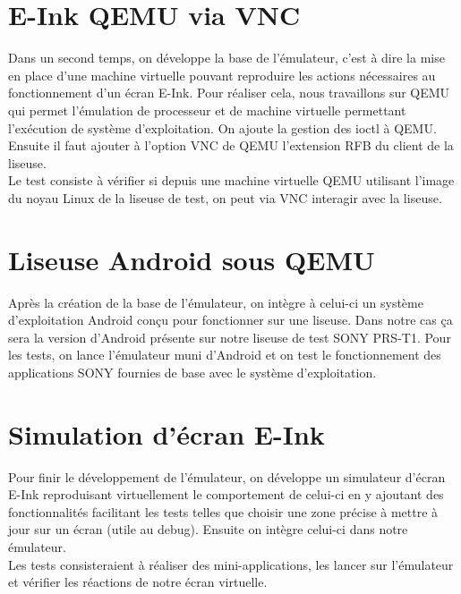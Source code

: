 \newpage

\section{E-Ink QEMU via VNC}

Dans un second temps, on développe la base de l'émulateur, c'est à dire la mise en place d'une machine virtuelle pouvant reproduire les actions nécessaires au fonctionnement d'un écran E-Ink. Pour réaliser cela, nous travaillons sur QEMU qui permet l'émulation de processeur et de machine virtuelle permettant l'exécution de système d'exploitation. On ajoute la gestion des ioctl à QEMU. Ensuite il faut ajouter à l'option VNC de QEMU l'extension RFB du client de la liseuse.
\\Le test consiste à vérifier si depuis une machine virtuelle QEMU utilisant l'image du noyau Linux de la liseuse de test, on peut via VNC interagir avec la liseuse. 


\section{Liseuse Android sous QEMU}

Après la création de la base de l'émulateur, on intègre à celui-ci un système d'exploitation Android conçu pour fonctionner sur une liseuse. Dans notre cas ça sera la version d'Android présente sur notre liseuse de test SONY PRS-T1.
Pour les tests, on lance l'émulateur muni d'Android et on test le fonctionnement des applications SONY fournies de base avec le système d'exploitation.

\section{Simulation d'écran E-Ink}

Pour finir le développement de l'émulateur, on développe un simulateur d'écran E-Ink reproduisant virtuellement le comportement de celui-ci en y ajoutant des fonctionnalités facilitant les tests telles que choisir une zone précise à mettre à jour sur un écran (utile au debug). Ensuite on intègre celui-ci dans notre émulateur.
\\Les tests consisteraient à réaliser des mini-applications, les lancer sur l'émulateur et vérifier les réactions de notre écran virtuelle.

